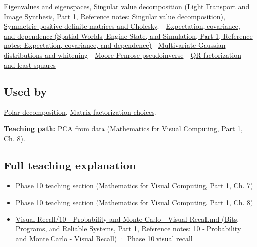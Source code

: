 \hypertarget{appendix-ad175ef3c5bf-prerequisites}{}

\hyperref[appendix-0b3be18411f9]{Eigenvalues and eigenspaces}, \href{../04-Light-Transport-and-Image-Synthesis-P01/main.pdf\#appendix-1fad5e7f36fa}{Singular value decomposition (Light Transport and Image Synthesis, Part 1, Reference notes: Singular value decomposition)}, \hyperref[appendix-50d2ea3c9b26]{Symmetric positive-definite matrices and Cholesky}. - \href{../05-Spatial-Worlds-Engine-State-and-Simulation-P01/main.pdf\#appendix-54c383df9992}{Expectation, covariance, and dependence (Spatial Worlds, Engine State, and Simulation, Part 1, Reference notes: Expectation, covariance, and dependence)} - \hyperref[appendix-12bbe185dbe5]{Multivariate Gaussian distributions and whitening} - \hyperref[appendix-541306fdbc1b]{Moore-Penrose pseudoinverse} - \hyperref[appendix-c3421e6b4f2c]{QR factorization and least squares}

\subsection{Used by}\label{appendix-ad175ef3c5bf-used-by}

\hypertarget{appendix-ad175ef3c5bf-used-by}{}

\hyperref[appendix-73f5bcf7a462]{Polar decomposition}, \hyperref[appendix-221a483bec2d]{Matrix factorization choices}.

\textbf{Teaching path:} \href{../02-Mathematics-for-Visual-Computing-P01/main.pdf\#02-foundations-ii-ch024-pca-turns-a-cloud-of-points-into-measured-variation}{PCA from data (Mathematics for Visual Computing, Part 1, Ch. 8)}.

\subsection{Full teaching explanation}\label{appendix-ad175ef3c5bf-full-teaching-explanation}

\hypertarget{appendix-ad175ef3c5bf-full-teaching-explanation}{}

\begin{itemize}
\tightlist
\item
  \href{../02-Mathematics-for-Visual-Computing-P01/main.pdf\#02-foundations-ii-ch023-expected-values-describe-centers-covariance-describes-dependence}{Phase 10 teaching section (Mathematics for Visual Computing, Part 1, Ch. 7)}
\item
  \href{../02-Mathematics-for-Visual-Computing-P01/main.pdf\#02-foundations-ii-ch024-waiting-times-event-counts-and-covariance-geometry}{Phase 10 teaching section (Mathematics for Visual Computing, Part 1, Ch. 8)}
\item
  \href{../01-Bits-Programs-and-Reliable-Systems-P01/main.pdf\#appendix-cb5af353ef77}{Visual Recall/10 - Probability and Monte Carlo - Visual Recall.md (Bits, Programs, and Reliable Systems, Part 1, Reference notes: 10 - Probability and Monte Carlo - Visual Recall)} · Phase 10 visual recall
\end{itemize}

